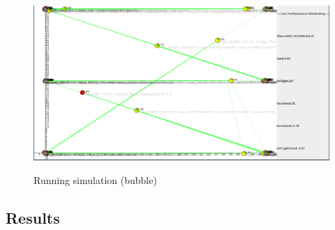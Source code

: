 \begin{figure}[h!]
	\begin{center}
    \label{fig:bubble_live}
    \includegraphics[scale=0.25]{img/bubble_live.png}
    \caption{Running simulation (bubble)}
  \end{center}
\end{figure}

\newpage
\subsection{Results}
\label{exp_results}

